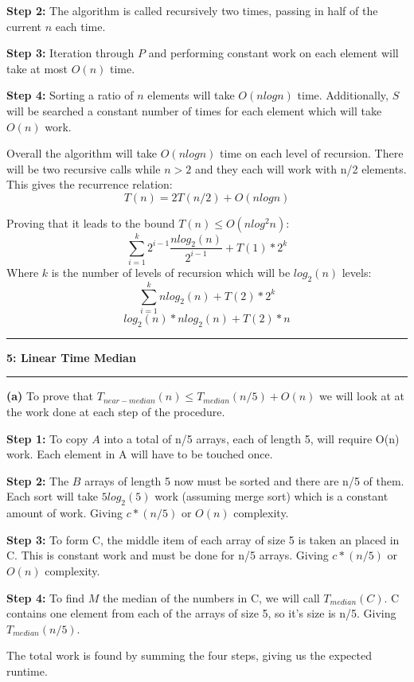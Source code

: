 \documentclass[11pt]{article}
\newcommand\question[2]{\vspace{.25in}\hrule\textbf{#1: #2}\vspace{.5em}\hrule\vspace{.10in}}
\renewcommand\part[1]{\vspace{.10in}\textbf{(#1)}}
\begin{document}
\textbf{Step 2:} The algorithm is called recursively two times, passing in half of the current $n$ each time.

\textbf{Step 3:} Iteration through $P$ and performing constant work on each element will take at most $O(n)$ time.

\textbf{Step 4:} Sorting a ratio of $n$ elements will take $O(nlogn)$ time. Additionally, $S$ will be searched a constant number of times for each element which will take $O(n)$ work.

Overall the algorithm will take $O(nlogn)$ time on each level of recursion. There will be two recursive calls while $n > 2$ and they each will work with n/2 elements. This gives the recurrence relation:
$$T(n) = 2T(n/2) + O(nlogn)$$

Proving that it leads to the bound $T(n) \leq O(nlog^2n)$:
$$\sum\limits_{i=1}^k 2^{i-1} \frac{nlog_2(n)}{2^{i-1}} + T(1) * 2^k$$
Where $k$ is the number of levels of recursion which will be $log_2(n)$ levels:
$$\sum\limits_{i=1}^k nlog_2(n) + T(2) * 2^k$$
$$log_2(n) * nlog_2(n) + T(2) * n$$



\question{5}{Linear Time Median}

\part{a} To prove that $T_{near-median}(n) \leq T_{median}(n/5) + O(n)$ we will look at at the work done at each step of the procedure.

\textbf{Step 1:} To copy $A$ into a total of n/5 arrays, each of length 5, will require O(n) work. Each element in A will have to be touched once.

\textbf{Step 2:} The $B$ arrays of length 5 now must be sorted and there are n/5 of them. Each sort will take $5log_2(5)$ work (assuming merge sort) which is a constant amount of work. Giving $c * (n/5)$ or $O(n)$ complexity.

\textbf{Step 3:} To form C, the middle item of each array of size 5 is taken an placed in C. This is constant work and must be done for n/5 arrays. Giving $c * (n/5)$ or $O(n)$ complexity.

\textbf{Step 4:} To find $M$ the median of the numbers in C, we will call $T_{median}(C)$. C contains one element from each of the arrays of size 5, so it's size is n/5. Giving $T_{median}(n/5)$.

The total work is found by summing the four steps, giving us the expected runtime.
\end{document}
